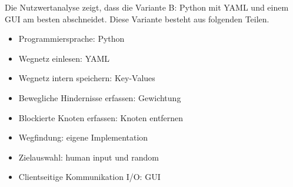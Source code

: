 Die Nutzwertanalyse zeigt, dass die Variante B: Python mit YAML und einem GUI am besten abschneidet. Diese Variante besteht aus folgenden Teilen.

\begin{itemize}
    \item Programmiersprache: Python
    \item Wegnetz einlesen: YAML
    \item Wegnetz intern speichern: Key-Values
    \item Bewegliche Hindernisse erfassen: Gewichtung
    \item Blockierte Knoten erfassen: Knoten entfernen
    \item Wegfindung: eigene Implementation
    \item Zielauswahl: human input und random
    \item Clientseitige Kommunikation I/O: GUI
\end{itemize}